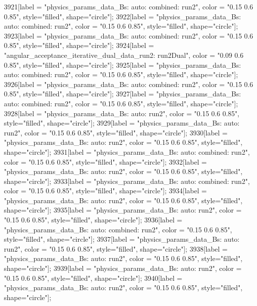 {	3921[label = "physics_params_data_Bs\nfit: auto\ntrigger: combined\nyear: run2", color = "0.15 0.6 0.85", style="filled", shape="circle"];
	3922[label = "physics_params_data_Bs\nfit: auto\ntrigger: combined\nyear: run2", color = "0.15 0.6 0.85", style="filled", shape="circle"];
	3923[label = "physics_params_data_Bs\nfit: auto\ntrigger: combined\nyear: run2", color = "0.15 0.6 0.85", style="filled", shape="circle"];
	3924[label = "angular_acceptance_iterative_dual_data_run2\nangacc: run2Dual", color = "0.09 0.6 0.85", style="filled", shape="circle"];
	3925[label = "physics_params_data_Bs\nfit: auto\ntrigger: combined\nyear: run2", color = "0.15 0.6 0.85", style="filled", shape="circle"];
	3926[label = "physics_params_data_Bs\nfit: auto\ntrigger: combined\nyear: run2", color = "0.15 0.6 0.85", style="filled", shape="circle"];
	3927[label = "physics_params_data_Bs\nfit: auto\ntrigger: combined\nyear: run2", color = "0.15 0.6 0.85", style="filled", shape="circle"];
	3928[label = "physics_params_data_Bs\nfit: auto\nyear: run2", color = "0.15 0.6 0.85", style="filled", shape="circle"];
	3929[label = "physics_params_data_Bs\nfit: auto\nyear: run2", color = "0.15 0.6 0.85", style="filled", shape="circle"];
	3930[label = "physics_params_data_Bs\nfit: auto\nyear: run2", color = "0.15 0.6 0.85", style="filled", shape="circle"];
	3931[label = "physics_params_data_Bs\nfit: auto\ntrigger: combined\nyear: run2", color = "0.15 0.6 0.85", style="filled", shape="circle"];
	3932[label = "physics_params_data_Bs\nfit: auto\nyear: run2", color = "0.15 0.6 0.85", style="filled", shape="circle"];
	3933[label = "physics_params_data_Bs\nfit: auto\ntrigger: combined\nyear: run2", color = "0.15 0.6 0.85", style="filled", shape="circle"];
	3934[label = "physics_params_data_Bs\nfit: auto\nyear: run2", color = "0.15 0.6 0.85", style="filled", shape="circle"];
	3935[label = "physics_params_data_Bs\nfit: auto\nyear: run2", color = "0.15 0.6 0.85", style="filled", shape="circle"];
	3936[label = "physics_params_data_Bs\nfit: auto\ntrigger: combined\nyear: run2", color = "0.15 0.6 0.85", style="filled", shape="circle"];
	3937[label = "physics_params_data_Bs\nfit: auto\nyear: run2", color = "0.15 0.6 0.85", style="filled", shape="circle"];
	3938[label = "physics_params_data_Bs\nfit: auto\nyear: run2", color = "0.15 0.6 0.85", style="filled", shape="circle"];
	3939[label = "physics_params_data_Bs\nfit: auto\nyear: run2", color = "0.15 0.6 0.85", style="filled", shape="circle"];
	3940[label = "physics_params_data_Bs\nfit: auto\nyear: run2", color = "0.15 0.6 0.85", style="filled", shape="circle"];
}
